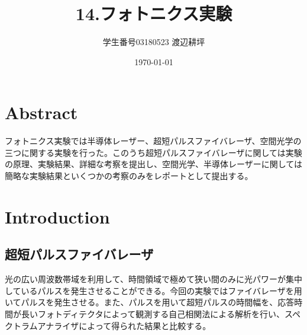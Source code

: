\documentclass[titlepage]{jsarticle}
\title{14.フォトニクス実験}
\author{学生番号03180523 渡辺耕坪}
\date{\today}
\begin{document}
\maketitle

\section{Abstract}
フォトニクス実験では半導体レーザー、超短パルスファイバレーザ、空間光学の三つに関する実験を行った。このうち超短パルスファイバレーザに関しては実験の原理、実験結果、詳細な考察を提出し、空間光学、半導体レーザーに関しては簡略な実験結果といくつかの考察のみをレポートとして提出する。
\section{Introduction}
\subsection{超短パルスファイバレーザ}
光の広い周波数帯域を利用して、時間領域で極めて狭い間のみに光パワーが集中しているパルスを発生させることができる。今回の実験ではファイバレーザを用いてパルスを発生させる。また、パルスを用いて超短パルスの時間幅を、応答時間が長いフォトディテクタによって観測する自己相関法による解析を行い、スペクトラムアナライザによって得られた結果と比較する。
\end{document}
